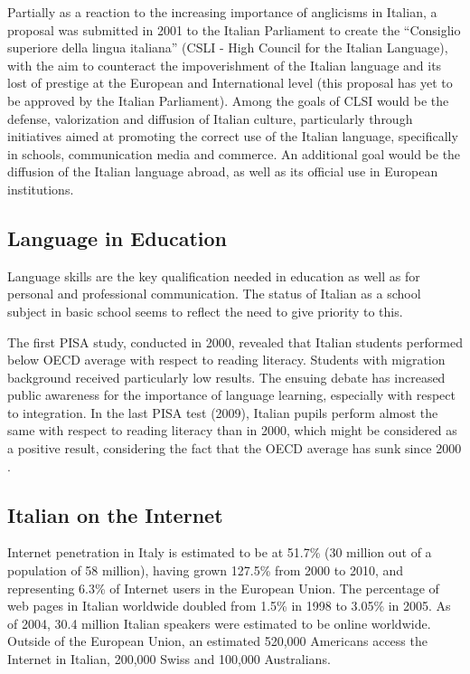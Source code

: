 \documentclass[]{../../metanetpaper}
\begin{document}
\begin{multicols}{2}

Partially as a reaction to the increasing importance of anglicisms in Italian,
a proposal was submitted in 2001 to the Italian Parliament to create the
“Consiglio superiore della lingua italiana” (CSLI - High Council for the
Italian Language), with the aim to counteract the impoverishment of the
Italian language and its lost of prestige at the European and International
level (this proposal has yet to be approved by the Italian Parliament). Among
the goals of CLSI would be the defense, valorization and diffusion of Italian
culture, particularly through initiatives aimed at promoting the correct use
of the Italian language, specifically in schools, communication media and
commerce. An additional goal would be the diffusion of the Italian language
abroad, as well as its official use in European institutions.





\subsection{Language in Education}


Language skills are the key qualification needed in education as well as for
personal and professional communication. The status of Italian as a school
subject in basic school seems to reflect the need to give priority to this. 


The first PISA study, conducted in 2000, revealed that Italian students
performed below OECD average with respect to reading literacy. Students with
migration background received particularly low results. The ensuing debate has
increased public awareness for the importance of language learning, especially
with respect to integration. In the last PISA test (2009), Italian pupils
perform almost the same with respect to reading literacy than in 2000, which
might be considered as a positive result, considering the fact that the OECD
average has sunk since 2000 \cite{Pisa1}. 



\subsection{Italian on the Internet}

Internet penetration in Italy is estimated to be at 51.7\% (30 million out of
a population of 58 million), having grown 127.5\% from 2000 to 2010, and
representing 6.3\% of Internet users in the European Union. The percentage of
web pages in Italian worldwide doubled from 1.5\% in 1998 to 3.05\% in
2005. As of 2004, 30.4 million Italian speakers were estimated to be online
worldwide. Outside of the European Union, an estimated 520,000 Americans
access the Internet in Italian, 200,000 Swiss and 100,000 Australians.




\end{multicols}
\end{document}
